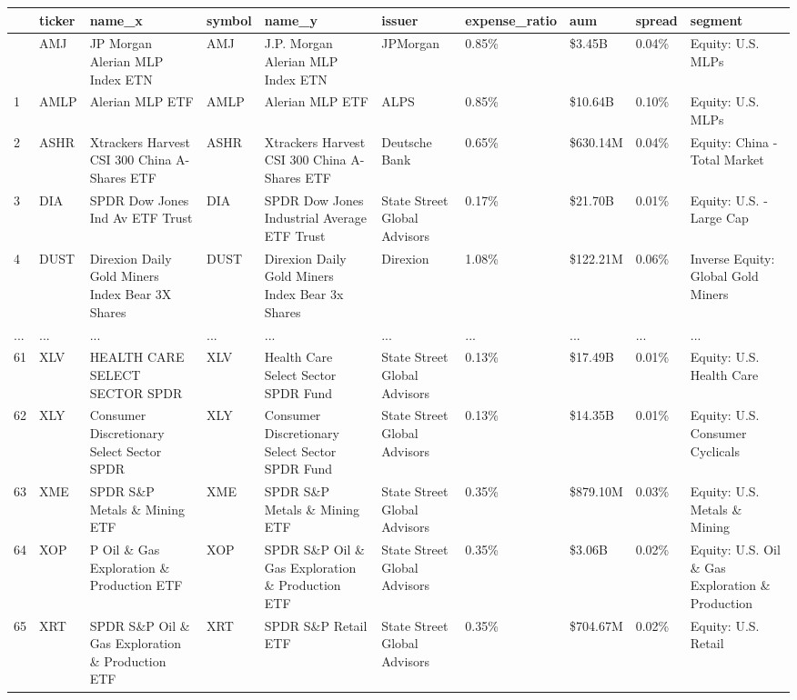 \documentclass[
  letterpaper,
  DIV=11,
  numbers=noendperiod]{scrreprt}
\begin{document}
\begin{longtable}[]{@{}llllllllll@{}}
\toprule\noalign{}
& ticker & name\_x & symbol & name\_y & issuer & expense\_ratio & aum &
spread & segment \\
\midrule\noalign{}
\endhead
\bottomrule\noalign{}
\endlastfoot
0 & AMJ & JP Morgan Alerian MLP Index ETN & AMJ & J.P. Morgan Alerian
MLP Index ETN & JPMorgan & 0.85\% & \$3.45B & 0.04\% & Equity: U.S.
MLPs \\
1 & AMLP & Alerian MLP ETF & AMLP & Alerian MLP ETF & ALPS & 0.85\% &
\$10.64B & 0.10\% & Equity: U.S. MLPs \\
2 & ASHR & Xtrackers Harvest CSI 300 China A-Shares ETF & ASHR &
Xtrackers Harvest CSI 300 China A-Shares ETF & Deutsche Bank & 0.65\% &
\$630.14M & 0.04\% & Equity: China - Total Market \\
3 & DIA & SPDR Dow Jones Ind Av ETF Trust & DIA & SPDR Dow Jones
Industrial Average ETF Trust & State Street Global Advisors & 0.17\% &
\$21.70B & 0.01\% & Equity: U.S. - Large Cap \\
4 & DUST & Direxion Daily Gold Miners Index Bear 3X Shares & DUST &
Direxion Daily Gold Miners Index Bear 3x Shares & Direxion & 1.08\% &
\$122.21M & 0.06\% & Inverse Equity: Global Gold Miners \\
... & ... & ... & ... & ... & ... & ... & ... & ... & ... \\
61 & XLV & HEALTH CARE SELECT SECTOR SPDR & XLV & Health Care Select
Sector SPDR Fund & State Street Global Advisors & 0.13\% & \$17.49B &
0.01\% & Equity: U.S. Health Care \\
62 & XLY & Consumer Discretionary Select Sector SPDR & XLY & Consumer
Discretionary Select Sector SPDR Fund & State Street Global Advisors &
0.13\% & \$14.35B & 0.01\% & Equity: U.S. Consumer Cyclicals \\
63 & XME & SPDR S\&P Metals \& Mining ETF & XME & SPDR S\&P Metals \&
Mining ETF & State Street Global Advisors & 0.35\% & \$879.10M & 0.03\%
& Equity: U.S. Metals \& Mining \\
64 & XOP & P Oil \& Gas Exploration \& Production ETF & XOP & SPDR S\&P
Oil \& Gas Exploration \& Production ETF & State Street Global Advisors
& 0.35\% & \$3.06B & 0.02\% & Equity: U.S. Oil \& Gas Exploration \&
Production \\
65 & XRT & SPDR S\&P Oil \& Gas Exploration \& Production ETF & XRT &
SPDR S\&P Retail ETF & State Street Global Advisors & 0.35\% & \$704.67M
& 0.02\% & Equity: U.S. Retail \\
\end{longtable}
\end{document}
